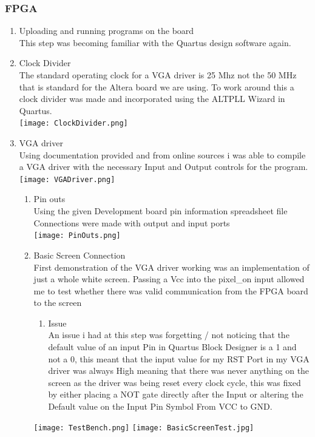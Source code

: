 \documentclass{article}
\begin{document}
\subsubsection{FPGA}
\begin{enumerate}
    
    \item Uploading and running programs on the board\\
            This step was becoming familiar with the Quartus design software again. 
    \item Clock Divider\\
            The standard operating clock for a VGA driver is 25 Mhz not the 50 MHz that is          
            standard for the Altera board we are using. 
            To work around this a clock divider was made and incorporated using the ALTPLL Wizard in Quartus.\\
    \texttt{[image: ClockDivider.png]}
    \item VGA driver\\
        Using documentation provided and from online sources i was able to compile a VGA driver with the necessary Input and Output controls for the program. \\
        \texttt{[image: VGADriver.png]}
    \begin{enumerate}
    \item Pin outs\\
        Using the given Development board pin information spreadsheet file Connections were made with output and input ports\\
        \texttt{[image: PinOuts.png]}
    \newpage
    \item Basic Screen Connection\\
        First demonstration of the VGA driver working was an implementation of just a whole white screen. Passing a Vcc into the pixel\_on input allowed me to test whether there was valid communication from the FPGA board to the screen\\
            \begin{enumerate}
                \item Issue\\
                    An issue i had at this step was forgetting / not noticing that the default value of an input Pin in Quartus Block Designer is a 1 and not a 0, this meant that the input value for my RST Port in my VGA driver was always High meaning that there was never anything on the screen as the driver was being reset every clock cycle, this was fixed by either placing a NOT gate directly after the Input or altering the Default value on the Input Pin Symbol From VCC to GND.
            \end{enumerate}
            \begin{center}
                \texttt{[image: TestBench.png]}
                \texttt{[image: BasicScreenTest.jpg]}    
            \end{center}
            

\end{enumerate}
\end{enumerate}
\end{document}
